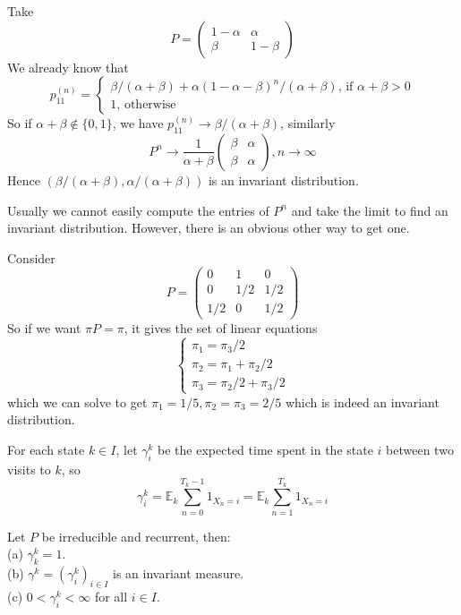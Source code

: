 \begin{example}
    Take
    $$P=\begin{pmatrix}
        1-\alpha&\alpha\\
        \beta&1-\beta
    \end{pmatrix}$$
    We already know that
    $$p_{11}^{(n)}=\begin{cases}
        \beta/(\alpha+\beta)+\alpha(1-\alpha-\beta)^n/(\alpha+\beta)\text{, if $\alpha+\beta>0$}\\
        1\text{, otherwise}
    \end{cases}$$
    So if $\alpha+\beta\notin\{0,1\}$, we have $p_{11}^{(n)}\to\beta/(\alpha+\beta)$, similarly
    $$P^n\to\frac{1}{\alpha+\beta}\begin{pmatrix}
        \beta&\alpha\\
        \beta&\alpha
    \end{pmatrix},n\to\infty$$
    Hence $(\beta/(\alpha+\beta),\alpha/(\alpha+\beta))$ is an invariant distribution.
\end{example}
Usually we cannot easily compute the entries of $P^n$ and take the limit to find an invariant distribution.
However, there is an obvious other way to get one.
\begin{example}
    Consider
    $$P=\begin{pmatrix}
        0&1&0\\
        0&1/2&1/2\\
        1/2&0&1/2
    \end{pmatrix}$$
    So if we want $\pi P=\pi$, it gives the set of linear equations
    $$\begin{cases}
        \pi_1=\pi_3/2\\
        \pi_2=\pi_1+\pi_2/2\\
        \pi_3=\pi_2/2+\pi_3/2
    \end{cases}$$
    which we can solve to get $\pi_1=1/5,\pi_2=\pi_3=2/5$ which is indeed an invariant distribution.
\end{example}
\begin{definition}
    For each state $k\in I$, let $\gamma_i^k$ be the expected time spent in the state $i$ between two visits to $k$, so
    $$\gamma_i^k=\mathbb E_k\sum_{n=0}^{T_k-1}1_{X_n=i}=\mathbb E_k\sum_{n=1}^{T_k}1_{X_n=i}$$
\end{definition}
\begin{theorem}
    Let $P$ be irreducible and recurrent, then:\\
    (a) $\gamma_k^k=1$.\\
    (b) $\gamma^k=(\gamma_i^k)_{i\in I}$ is an invariant measure.\\
    (c) $0<\gamma_i^k<\infty$ for all $i\in I$.
\end{theorem}
